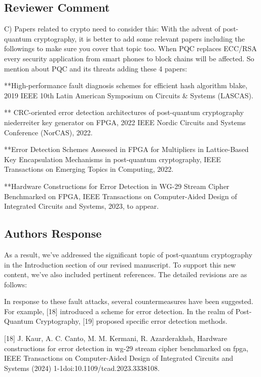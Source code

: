 \subsection{Reviewer Comment}
C) Papers related to crypto need to consider this: With the advent of post-quantum cryptography, it is better to add some relevant papers including the followings to make sure you cover that topic too. When PQC replaces ECC/RSA every security application from smart phones to block chains will be affected. So mention about PQC and its threats adding these 4 papers:

**High-performance fault diagnosis schemes for efficient hash algorithm blake, 2019 IEEE 10th Latin American Symposium on Circuits \& Systems (LASCAS).

** CRC-oriented error detection architectures of post-quantum cryptography niederreiter key generator on FPGA, 2022 IEEE Nordic Circuits and Systems Conference (NorCAS), 2022.

**Error Detection Schemes Assessed in FPGA for Multipliers in Lattice-Based Key Encapsulation Mechanisms in post-quantum cryptography, IEEE Transactions on Emerging Topics in Computing, 2022.

**Hardware Constructions for Error Detection in WG-29 Stream Cipher Benchmarked on FPGA, IEEE Transactions on Computer-Aided Design of Integrated Circuits and Systems, 2023, to appear.



\subsection{Authors Response}

As a result, we've addressed the significant topic of post-quantum cryptography in the Introduction section of our revised manuscript. To support this new content, we've also included pertinent references. The detailed revisions are as follows:


\color{blue}

In response to these fault attacks, several countermeasures have been suggested. For example, [18] introduced a scheme for error detection. In the realm of Post-Quantum Cryptography, [19] proposed specific error detection methods.

	[18] J. Kaur, A. C. Canto, M. M. Kermani, R. Azarderakhsh, Hardware constructions for error detection in wg-29 stream cipher benchmarked on fpga, IEEE Transactions on Computer-Aided Design of Integrated Circuits and Systems (2024) 1-1doi:10.1109/tcad.2023.3338108.

